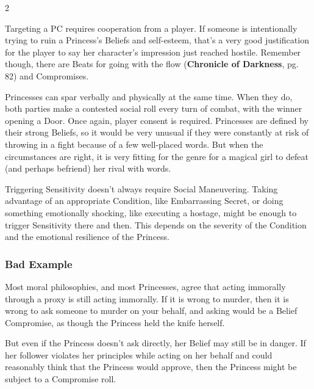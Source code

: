 \begin{multicols}{2}
\begin{mybox}
Targeting a PC requires cooperation from a player. If someone is intentionally trying to ruin a Princess's Beliefs and self-esteem, that's a very good justification for the player to say her character's impression just reached hostile. Remember though, there are Beats for going with the flow (\textbf{Chronicle of Darkness}, pg. 82) and Compromises.

Princesses can spar verbally and physically at the same time. When they do, both parties make a contested social roll every turn of combat, with the winner opening a Door. Once again, player consent is required. Princesses are defined by their strong Beliefs, so it would be very unusual if they were constantly at risk of throwing in a fight because of a few well-placed words. But when the circumstances are right, it is very fitting for the genre for a magical girl to defeat (and perhaps befriend) her rival with words.

Triggering Sensitivity doesn't always require Social Maneuvering. Taking advantage of an appropriate Condition, like Embarrassing Secret, or doing something emotionally shocking, like executing a hostage, might be enough to trigger Sensitivity there and then. This depends on the severity of the Condition and the emotional resilience of the Princess.

\end{mybox}

\subsubsection*{Bad Example}

Most moral philosophies, and most Princesses, agree that acting immorally through a proxy is still acting immorally. If it is wrong to murder, then it is wrong to ask someone to murder on your behalf, and asking would be a Belief Compromise, as though the Princess held the knife herself. 

But even if the Princess doesn't ask directly, her Belief may still be in danger. If her follower violates her principles while acting on her behalf and could reasonably think that the Princess would approve, then the Princess might be subject to a Compromise roll. 


\end{multicols}
